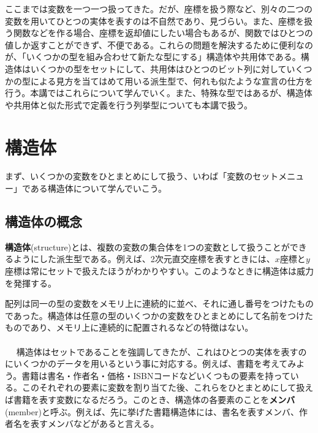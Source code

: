 ここまでは変数を一つ一つ扱ってきた。だが、座標を扱う際など、別々の二つの変数を用いてひとつの実体を表すのは不自然であり、見づらい。また、座標を扱う関数などを作る場合、座標を返却値にしたい場合もあるが、関数ではひとつの値しか返すことができず、不便である。これらの問題を解決するために便利なのが、「いくつかの型を組み合わせて新たな型にする」構造体や共用体である。構造体はいくつかの型をセットにして、共用体はひとつのビット列に対していくつかの型による見方を当てはめて用いる派生型で、何れも似たような宣言の仕方を行う。本講ではこれらについて学んでいく。また、特殊な型ではあるが、構造体や共用体と似た形式で定義を行う列挙型についても本講で扱う。

\section{構造体}
まず、いくつかの変数をひとまとめにして扱う、いわば「変数のセットメニュー」である構造体について学んでいこう。
\subsection{構造体の概念}
\textbf{構造体}(structure)とは、複数の変数の集合体を1つの変数として扱うことができるようにした派生型である。例えば、2次元直交座標を表すときには、$x$座標と$y$座標は常にセットで扱えたほうがわかりやすい。このようなときに構造体は威力を発揮する。

配列は同一の型の変数をメモリ上に連続的に並べ、それに通し番号をつけたものであった。構造体は任意の型のいくつかの変数をひとまとめにして名前をつけたものであり、メモリ上に連続的に配置されるなどの特徴はない。
\\ \\　
構造体はセットであることを強調してきたが、これはひとつの実体を表すのにいくつかのデータを用いるという事に対応する。例えば、書籍を考えてみよう。書籍は書名・作者名・価格・ISBNコードなどいくつもの要素を持っている。このそれぞれの要素に変数を割り当てた後、これらをひとまとめにして扱えば書籍を表す変数になるだろう。このとき、構造体の各要素のことを\textbf{メンバ}(member)と呼ぶ。例えば、先に挙げた書籍構造体には、書名を表すメンバ、作者名を表すメンバなどがあると言える。

